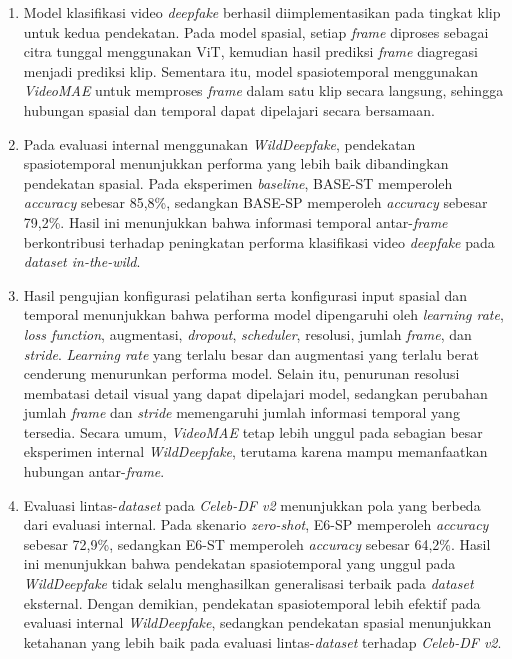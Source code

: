 \begin{enumerate}[noitemsep]
	\item Model klasifikasi video \textit{deepfake} berhasil diimplementasikan pada tingkat klip untuk kedua pendekatan. Pada model spasial, setiap \textit{frame} diproses sebagai citra tunggal menggunakan ViT, kemudian hasil prediksi \textit{frame} diagregasi menjadi prediksi klip. Sementara itu, model spasiotemporal menggunakan \textit{VideoMAE} untuk memproses \textit{frame} dalam satu klip secara langsung, sehingga hubungan spasial dan temporal dapat dipelajari secara bersamaan.
	\item Pada evaluasi internal menggunakan \textit{WildDeepfake}, pendekatan spasiotemporal menunjukkan performa yang lebih baik dibandingkan pendekatan spasial. Pada eksperimen \textit{baseline}, BASE-ST memperoleh \textit{accuracy} sebesar 85,8\%, sedangkan BASE-SP memperoleh \textit{accuracy} sebesar 79,2\%. Hasil ini menunjukkan bahwa informasi temporal antar-\textit{frame} berkontribusi terhadap peningkatan performa klasifikasi video \textit{deepfake} pada \textit{dataset in-the-wild}.
	\item Hasil pengujian konfigurasi pelatihan serta konfigurasi input spasial dan temporal menunjukkan bahwa performa model dipengaruhi oleh \textit{learning rate}, \textit{loss function}, augmentasi, \textit{dropout}, \textit{scheduler}, resolusi, jumlah \textit{frame}, dan \textit{stride}. \textit{Learning rate} yang terlalu besar dan augmentasi yang terlalu berat cenderung menurunkan performa model. Selain itu, penurunan resolusi membatasi detail visual yang dapat dipelajari model, sedangkan perubahan jumlah \textit{frame} dan \textit{stride} memengaruhi jumlah informasi temporal yang tersedia. Secara umum, \textit{VideoMAE} tetap lebih unggul pada sebagian besar eksperimen internal \textit{WildDeepfake}, terutama karena mampu memanfaatkan hubungan antar-\textit{frame}.
	\item Evaluasi lintas-\textit{dataset} pada \textit{Celeb-DF v2} menunjukkan pola yang berbeda dari evaluasi internal. Pada skenario \textit{zero-shot}, E6-SP memperoleh \textit{accuracy} sebesar 72,9\%, sedangkan E6-ST memperoleh \textit{accuracy} sebesar 64,2\%. Hasil ini menunjukkan bahwa pendekatan spasiotemporal yang unggul pada \textit{WildDeepfake} tidak selalu menghasilkan generalisasi terbaik pada \textit{dataset} eksternal. Dengan demikian, pendekatan spasiotemporal lebih efektif pada evaluasi internal \textit{WildDeepfake}, sedangkan pendekatan spasial menunjukkan ketahanan yang lebih baik pada evaluasi lintas-\textit{dataset} terhadap \textit{Celeb-DF v2}.
\end{enumerate}


